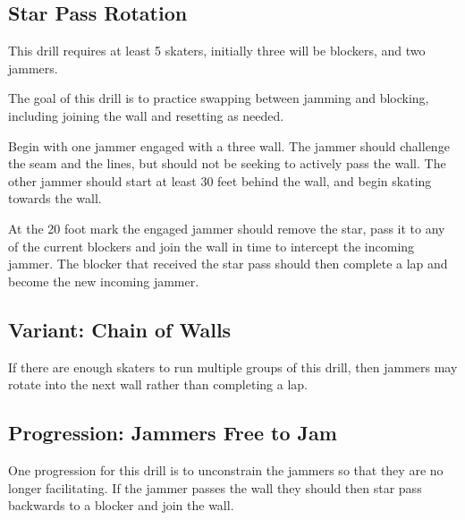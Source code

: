 \subsection*{Star Pass Rotation}
\label{drill:star_pass/rotation}

This drill requires at least 5 skaters, initially three will be blockers, and two jammers.

The goal of this drill is to practice swapping between jamming and blocking, including joining the wall and resetting as needed. 


Begin with one jammer engaged with a three wall.
The jammer should challenge the seam and the lines, but should not be seeking to actively pass the wall.  
The other jammer should start at least 30 feet behind the wall, and begin skating towards the wall.

At the 20 foot mark the engaged jammer should remove the star, pass it to any of the current blockers and join the wall in time to intercept the incoming jammer. 
The blocker that received the star pass should then complete a lap and become the new incoming jammer.

\subsection*{Variant: Chain of Walls}
If there are enough skaters to run multiple groups of this drill, then jammers may rotate into the next wall rather than completing a lap. 


\subsection*{Progression: Jammers Free to Jam}
One progression for this drill is to unconstrain the jammers so that they are no longer facilitating.
If the jammer passes the wall they should then star pass backwards to a blocker and join the wall. 
